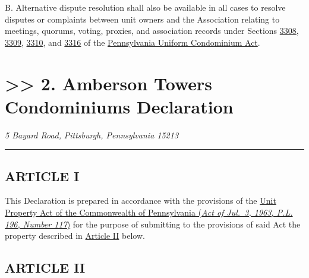 \documentclass[
  14pt,
]{book}
\begin{document}
B. Alternative dispute resolution shall also be available in all cases to resolve disputes or complaints between unit owners and the Association relating to meetings, quorums, voting, proxies, and association records under Sections \href{https://www.legis.state.pa.us/cfdocs/legis/LI/consCheck.cfm?txtType=HTM\&ttl=68\&div=0\&chpt=33\&sctn=8\&subsctn=0}{3308}, \href{https://www.legis.state.pa.us/cfdocs/legis/LI/consCheck.cfm?txtType=HTM\&ttl=68\&div=0\&chpt=33\&sctn=9\&subsctn=0}{3309}, \href{https://www.legis.state.pa.us/cfdocs/legis/LI/consCheck.cfm?txtType=HTM\&ttl=68\&div=0\&chpt=33\&sctn=10\&subsctn=0}{3310}, and \href{https://www.legis.state.pa.us/cfdocs/legis/LI/consCheck.cfm?txtType=HTM\&ttl=68\&div=0\&chpt=33\&sctn=16\&subsctn=0}{3316} of the \href{https://www.legis.state.pa.us/cfdocs/legis/LI/consCheck.cfm?txtType=HTM\&ttl=68f}{Pennsylvania Uniform Condominium Act}.

\hypertarget{amberson-towers-condominiums-declaration}{%
\chapter*{\texorpdfstring{\textgreater\textgreater{} 2. Amberson Towers Condominiums Declaration}{\textgreater\textgreater{} 2. Amberson Towers Condominiums   Declaration}}\label{amberson-towers-condominiums-declaration}}

\emph{5 Bayard Road, }
\emph{Pittsburgh, Pennsylvania 15213}

\begin{center}\rule{0.5\linewidth}{0.5pt}\end{center}

\hypertarget{article-i}{%
\section*{ARTICLE I}\label{article-i}}

This Declaration is prepared in accordance with the provisions of the \href{https://www.legis.state.pa.us/WU01/LI/LI/US/PDF/1963/0/0117..PDF}{Unit Property Act of the Commonwealth of Pennsylvania (\emph{Act of Jul.~3, 1963, P.L. 196, Number 117})} for the purpose of submitting to the provisions of said Act the property described in \protect\hyperlink{ArtII}{Article II} below.

\hypertarget{article-ii}{%
\section*{ARTICLE II}\label{article-ii}}
\end{document}
